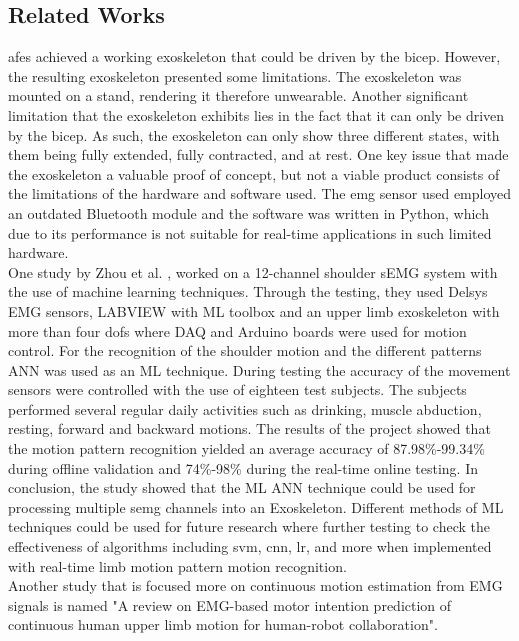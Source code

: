 \subsection{Related Works}
\acrshort{afes} \cite{AFES} achieved a working exoskeleton that could be driven by the bicep. However, the resulting 
exoskeleton presented some limitations. The exoskeleton was mounted on a stand, rendering it therefore unwearable. Another significant limitation 
that the exoskeleton exhibits lies in the fact that it can only be driven by the bicep. As such, the exoskeleton can only show three different states, 
with them being fully extended, fully contracted, and at rest. One key issue that made the exoskeleton a valuable proof of concept, but not a viable 
product consists of the limitations of the hardware and software used. The \acrshort{emg} sensor used employed an outdated Bluetooth module and the software was 
written in Python, which due to its performance is not suitable for real-time applications in such limited hardware. 
\\
One study by Zhou et al. \cite{shoulderexo}, worked on a 12-channel shoulder sEMG system with the use of machine learning techniques. Through the testing, they used Delsys EMG sensors, LABVIEW with ML toolbox and an 
upper limb exoskeleton with more than four \acp{dof} where DAQ and Arduino boards were used for motion control. For the recognition of the shoulder motion and the different patterns ANN was used as an 
ML technique. During testing the accuracy of the movement sensors were controlled with the use of eighteen test subjects. The subjects performed several regular daily activities
such as drinking, muscle abduction, resting, forward and backward motions. The results of the project showed that the motion pattern recognition yielded an average accuracy of 87.98\%-99.34\% 
during offline validation and 74\%-98\% during the real-time online testing. In conclusion, the study showed that the ML ANN technique could be used for processing multiple \acrshort{semg} channels
into an Exoskeleton. Different methods of ML techniques could be used for future research  where further testing to check the effectiveness of algorithms including \acrfull{svm},
\acrfull{cnn}, \acrfull{lr}, and more when implemented with real-time limb motion pattern motion recognition.
\\
Another study that is focused more on continuous motion estimation from EMG signals is named "A review on EMG-based motor intention prediction of continuous human upper limb motion for human-robot collaboration"\cite{continuousemg}.
